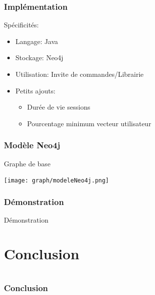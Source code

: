 \documentclass{beamer}
\begin{document}
        \begin{frame}
        \frametitle{Implémentation}
        Spécificités:
        \begin{itemize}
        \pause
        \item Langage: \pause Java
        \pause
        \item Stockage: \pause Neo4j
        \pause
        \item Utilisation: \pause Invite de commandes/Librairie
        \pause
        \item Petits ajouts:
        \pause
        \begin{itemize}
        \item Durée de vie sessions
        \pause
        \item Pourcentage minimum vecteur utilisateur
        \end{itemize}
        \end{itemize}
        \end{frame}
        \begin{frame}
        \frametitle{Modèle Neo4j}
        \begin{block}{Graphe de base}
        \begin{center}
        \texttt{[image: graph/modeleNeo4j.png]}
        \end{center}
        \end{block}
        \end{frame}
        \begin{frame}
        \frametitle{Démonstration}
        \begin{center}
        Démonstration
        \end{center}
        \end{frame}

    \section{Conclusion}
        \section{}
            \begin{frame}
                \frametitle{Conclusion}
            \end{frame}
\end{document}
